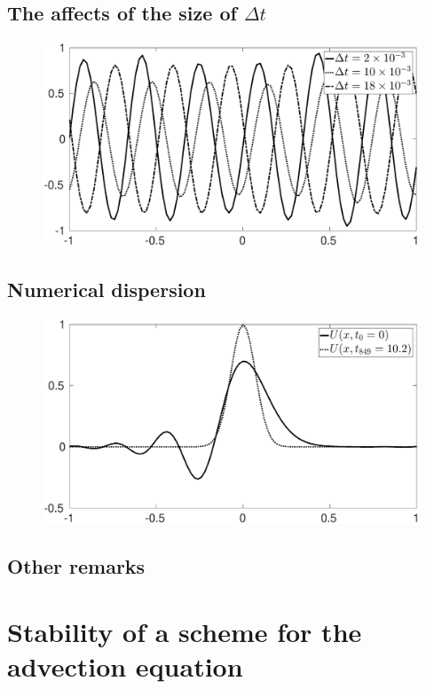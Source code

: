 \documentclass[11pt,letter, swedish, english
]{article}
\newcommand{\Dt}{\ensuremath{\Delta{t}}}
\begin{document}
\subsection{The affects of the size of $\Dt$}
\begin{figure}
\centering
\includegraphics[width=1\textwidth]{1c.eps}
\caption{}
\label{fig:1c}
\end{figure}


\subsection{Numerical dispersion}
\begin{figure}
\centering
\includegraphics[width=1\textwidth]{1d.eps}
\caption{}
\label{fig:1d}
\end{figure}



\subsection{Other remarks}



\section{Stability of a scheme for the advection equation}
\end{document}
